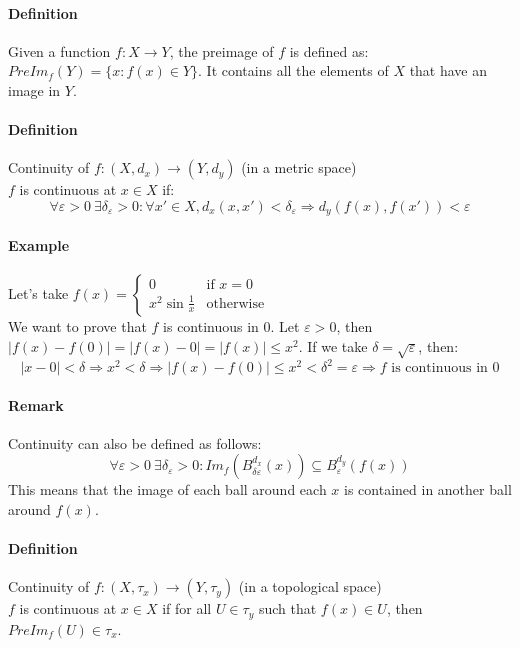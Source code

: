\documentclass{article}
\newcommand{\abs}[1]{\left|#1\right|}
\newcommand{\func}[3]{#1 : #2 \rightarrow #3}
\newcommand{\DS}{\displaystyle}
\newcommand{\Ep}{\varepsilon}
\newcommand{\Def}{\paragraph{Definition}}
\newcommand{\Remark}{\paragraph{Remark}}
\newcommand{\Example}{\paragraph{Example}}
\begin{document}
	\Def Given a function $\func{f}{X}{Y}$, the preimage of $f$ is defined as:
	$PreIm_f(Y) = \{ x : f(x) \in Y \}$. It contains all the elements of $X$ that
	have an image in $Y$.

	\Def Continuity of $\func{f}{(X,d_x)}{(Y,d_y)}$ (in a metric space)
\\$f$ is continuous at $x \in X$ if:
	\begin{equation*}
		\forall \Ep > 0 \ \exists \delta_\Ep > 0 : \forall x' \in X,
		d_x(x,x') < \delta_\Ep \Rightarrow d_y(f(x),f(x')) < \Ep
	\end{equation*}

	\Example Let's take $\DS f(x) = \begin{cases} 0 & \text{if } x = 0 \\ x^2
	\sin\frac{1}{x} & \text{otherwise} \end{cases}$
\\We want to prove that $f$ is continuous in 0. Let $\Ep > 0$, then
	$\abs{f(x) - f(0)} = \abs{f(x) - 0} = \abs{f(x)} \leq x^2$. If we take $\delta
	= \sqrt{\Ep}$, then:
	\begin{equation*}
		\abs{x - 0} < \delta \Rightarrow x^2 < \delta \Rightarrow \abs{f(x) - f(0)}
		\leq x^2 < \delta^2 = \Ep \Rightarrow f \text{ is continuous in 0}
	\end{equation*}

	\Remark Continuity can also be defined as follows:
	\begin{equation*}
		\forall \Ep > 0 \ \exists \delta_\Ep > 0 :
		Im_f(B_{\delta\Ep}^{d_x}(x)) \subseteq B_\Ep^{d_y}(f(x))
	\end{equation*}
	This means that the image of each ball around each $x$ is contained in another
	ball around $f(x)$.

	\Def Continuity of $\func{f}{(X,\tau_x)}{(Y,\tau_y)}$ (in a topological space)
\\$f$ is continuous at $x \in X$ if for all $U \in \tau_y$ such that $f(x) \in
	U$, then $PreIm_f(U) \in \tau_x$.
\end{document}
